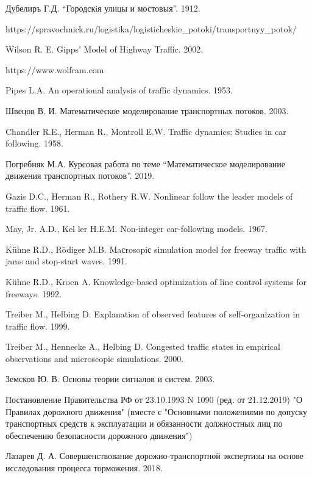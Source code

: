 \documentclass[12pt, a4paper]{extarticle}
\numberwithin{equation}{section}
\begin{document}
\begin{thebibliography}{**}
	Дубелиръ Г.Д. ``Городскiя улицы и мостовыя''. 1912.
	
	https://spravochnick.ru/logistika/logisticheskie\_potoki/transportnyy\_potok/
	
	Wilson R. E. Gipps’ Model of Highway Traffic. 2002.
	
	https://www.wolfram.com
	
	Pipes L.A. An operational analysis of traffic dynamics. 1953. 
	
	Швецов В. И. Математическое моделирование транспортных потоков. 2003. 
	
	Chandler R.E., Herman R., Montroll E.W. Traffic dynamics: Studies in car following. 1958.
	
	Погребняк М.А. Курсовая работа по теме ``Математическое моделирование движения транспортных потоков''. 2019.
	
	Gazis D.C., Herman R., Rothery R.W. Nonlinear follow the leader models of traffic flow. 1961.
	
	May, Jr. A.D., Kel ler H.E.M. Non-integer car-following models. 1967.
	
	K\"{u}hne R.D., R\"{o}diger M.B. Maсrosopiс simulation model for freeway traffic with jams
	and stop-start waves. 1991.
	
	K\"{u}hne R.D., Kroen A. Knowledge-based optimization of line сontrol systems for freeways. 1992.

	Treiber M., Helbing D. Explanation of observed features of self-organization in traffic flow.
	1999.
	
	Treiber M., Hennecke A., Helbing D. Congested traffic states in empirical observations and
	microscopic simulations. 2000.
	
	Земсков Ю. В. Основы теории сигналов и систем. 2003.
	
	Постановление Правительства РФ от 23.10.1993 N 1090 (ред. от 21.12.2019) "О Правилах дорожного движения" (вместе с "Основными положениями по допуску транспортных средств к эксплуатации и обязанности должностных лиц по обеспечению безопасности дорожного движения")

	Лазарев Д. А. Совершенствование дорожно-транспортной экспертизы на основе исследования процесса торможения. 2018.
\end{thebibliography}
\end{document}
